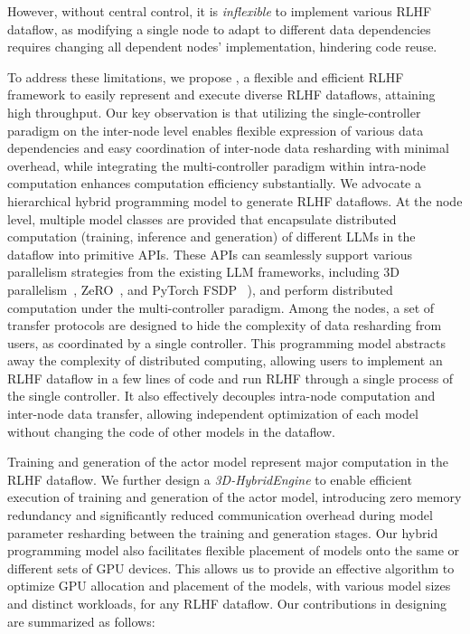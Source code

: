 However, without central control, it is \textit{inflexible} to implement various RLHF dataflow, as modifying a single node to adapt to different data dependencies requires
changing all dependent nodes' implementation, 
 hindering code reuse.


To address these limitations, we propose \textit{\sysname}, a flexible and efficient RLHF %
framework to easily represent and execute diverse RLHF dataflows, %
attaining high throughput.
Our key observation is that utilizing the single-controller paradigm on the inter-node level enables flexible expression of various data dependencies and easy coordination of inter-node data resharding with minimal overhead,
while integrating the multi-controller paradigm within intra-node computation enhances computation efficiency substantially.
We %
advocate a hierarchical hybrid programming model to generate RLHF dataflows.
At the node level, multiple model classes are provided that encapsulate distributed computation (training, inference and generation) of different LLMs in the dataflow into primitive APIs. %
These APIs %
can seamlessly support various parallelism strategies from the existing LLM %
frameworks, including 3D parallelism~\cite{shoeybi2019megatron}, ZeRO~\cite{rajbhandari2020zero}, and PyTorch FSDP~\cite{paszke2019pytorch}%
), and perform distributed computation under the multi-controller paradigm. %
Among the nodes, a set of transfer protocols are designed to hide the complexity of data resharding from users, as coordinated by a single controller.
This programming model abstracts away the complexity of distributed computing, allowing users to implement an RLHF dataflow in a few lines of code and run RLHF through a single process of the single controller.
It also effectively decouples intra-node computation and inter-node data transfer,
allowing %
independent optimization of each model 
without changing the code of other models in the dataflow.


Training and generation of the actor model represent major computation %
in the RLHF dataflow.
We further design a \textit{3D-HybridEngine} to enable efficient execution of training and generation of the actor model, introducing zero memory redundancy and significantly reduced communication overhead during model parameter resharding between the training and generation stages.
Our hybrid programming model also facilitates flexible placement of models onto the same or different sets of GPU devices. %
This allows us to provide an effective algorithm to optimize GPU allocation and placement of the models, with various model sizes and distinct workloads, for any RLHF dataflow.
Our contributions in designing \sysname{} are summarized as follows:




